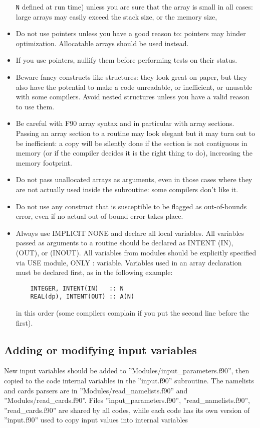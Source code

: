 \documentclass[12pt,a4paper]{article}
\begin{document}
\begin{itemize}
\texttt{N} defined at run time) unless you are sure that the array is
small in all cases: large arrays may easily exceed the stack size,
or the memory size,
\item Do not use pointers unless you have a good reason to:
pointers may hinder optimization. Allocatable arrays should be used instead.
\item If you use pointers, nullify them before performing tests on their
status.
\item Beware fancy constructs like structures: they look great on paper,
but they also have the potential to make a code unreadable, or inefficient,
or unusable with some compilers. Avoid nested structures unless you have a
valid reason to use them.
\item Be careful with F90 array syntax and in particular with
array sections. Passing an array section to a routine may look elegant
but it may turn out to be inefficient: a copy will be silently done
if the section is not contiguous in memory (or if the compiler
decides it is the right thing to do), increasing the memory footprint.
\item Do not pass unallocated arrays as arguments, even in those cases where
they are not actually used inside the subroutine: some compilers don't
like it.
\item Do not use any construct that is susceptible to be flagged as
out-of-bounds error, even if no actual out-of-bound error takes place.
\item Always use IMPLICIT NONE and declare all local variables.
All variables passed as arguments to a routine should be declared as
INTENT (IN), (OUT), or (INOUT). All variables from modules should be
explicitly specified via USE module, ONLY : variable. Variables used
in an array declaration must be declared first, as in the following
example:
\begin{verbatim}
    INTEGER, INTENT(IN)   :: N
    REAL(dp), INTENT(OUT) :: A(N)
\end{verbatim}
in this order (some compilers complain if you put the second line
before the first).
\end{itemize}

\subsection{Adding or modifying input variables}

New input variables should be added to
''Modules/input\_parameters.f90'',
then copied to the code internal variables in the ''input.f90''
subroutine. The namelists and cards parsers are in
''Modules/read\_namelists.f90'' and ''Modules/read\_cards.f90''.
Files ''input\_parameters.f90'', ''read\_namelists.f90'',
''read\_cards.f90'' are shared by all codes, while each code
has its own version of ''input.f90''  used to copy input values
into internal variables
\end{document}
